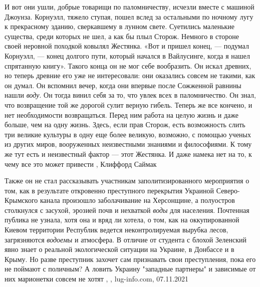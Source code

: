 И вот они ушли, добрые товарищи по паломничеству, исчезли вместе с машиной
Джоунза.  Корнуэлл, тяжело ступая, пошел вслед за остальными по ночному лугу к
прекрасному зданию, сверкавшему в лунном свете. Суетились маленькие существа,
среди которых не шел, а как бы плыл Сторож. Немного в стороне своей неровной
походкой ковылял Жестянка.  «Вот и пришел конец, — подумал Корнуэлл, — конец
долгого пути, который начался в Вайлусинге, когда я нашел спрятанную книгу».
Такого конца он не мог себе вообразить. Он искал древних, но теперь древние его
уже не интересовали: они оказались совсем не такими, как он думал.  Он вспомнил
вечер, когда они впервые после Сожженной равнины нашли \emph{воду}. Он тогда винил
себя за то, что увлек всех в паломничество. Он знал, что возвращение той же
дорогой сулит верную гибель. Теперь же все кончено, и нет необходимости
возвращаться. Перед ним работа на целую жизнь и даже больше, чем на одну жизнь.
Здесь, если прав Сторож, есть возможность слить три великие культуры в одну еще
более великую, возможно, с помощью ученых из других миров, вооруженных
неизвестными знаниями и философиями. К тому же тут есть и неизвестный фактор —
этот Жестянка. И даже намека нет на то, к чему все это может привести
, Клиффорд Саймак

Также он не стал рассказывать участникам заполитизированного мероприятия о том,
как в результате откровенно преступного перекрытия Украиной Северо-Крымского
канала произошло заболачивание на Херсонщине, а полуостров столкнулся с
засухой, эрозией почв и нехваткой \emph{воды} для населения. Почтенная публика
не узнала, хотя она и вряд ли хотела, о том, как на оккупированной Киевом
территории Республик ведется неконтролируемая вырубка лесов, загрязняются
\emph{водоемы} и атмосфера. В отличие от студента с блохой Зеленский явно
знает о реальной экологической ситуации на Украине, в Донбассе и в Крыму. Но
разве преступник захочет сам признавать свои преступления, пока его не поймают
с поличным? А ловить Украину "западные партнеры" и зависимые от них марионетки
совсем не хотят
, 
, lug-info.com, 07.11.2021

